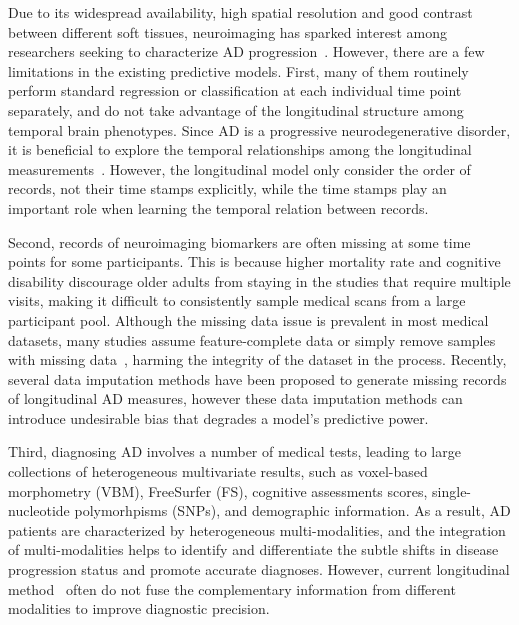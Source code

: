 Due to its widespread availability, high spatial resolution and good contrast between different soft tissues, neuroimaging has sparked interest among researchers seeking to characterize AD progression~\cite{stonnington2010predicting}.
However, there are a few limitations in the existing predictive models. 
First, many of them routinely perform standard regression or classification at each individual time point separately, and do not take advantage of the longitudinal structure among temporal brain phenotypes.
Since AD is a progressive neurodegenerative disorder, it is beneficial to explore the temporal relationships among the longitudinal measurements~\cite{wang2016prediction}. However, the longitudinal model only consider the order of records, not their time stamps explicitly, while the time stamps play an important role when learning the temporal relation between records.

Second, records of neuroimaging biomarkers are often missing at some time points for some participants. This is because higher mortality rate and cognitive disability discourage older adults from staying in the studies that require multiple visits, making it difficult to consistently sample medical scans from a large participant pool. Although the missing data issue is prevalent in most medical datasets, many studies assume feature-complete data or simply remove samples with missing data~\cite{stonnington2010predicting,liu2018joint}, harming the integrity of the dataset in the process. 
Recently, several data imputation methods have been proposed to generate missing records of longitudinal AD measures, however these data imputation methods can introduce undesirable bias that degrades a model's predictive power.
    
Third, diagnosing AD involves a number of medical tests, leading to large collections of heterogeneous multivariate results, such as voxel-based morphometry (VBM), FreeSurfer (FS), cognitive assessments scores, single-nucleotide polymorhpisms (SNPs), and demographic information.
As a result, AD patients are characterized by heterogeneous multi-modalities, and the integration of multi-modalities helps to identify and differentiate the subtle shifts in disease progression status and promote accurate diagnoses. 
However, current longitudinal method~\cite{wang2016prediction} often do not fuse the complementary information from different modalities to improve diagnostic precision.
    
